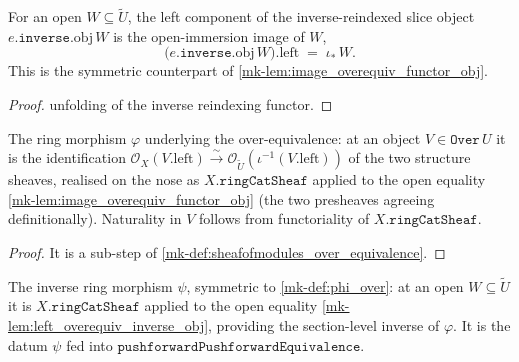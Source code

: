 \begin{lemma}\label{mk-lem:left_overequiv_inverse_obj}
  \leanok

  For an open \(W \subseteq \widetilde{U}\), the left component of the
  inverse-reindexed slice object \(e.\mathtt{inverse}.\mathrm{obj}\,W\) is the
  open-immersion image of \(W\),
  \[
    \bigl(e.\mathtt{inverse}.\mathrm{obj}\,W\bigr).\mathrm{left}
      \;=\; \iota_{\ast}\,W .
  \]
  This is the symmetric counterpart of \ref{mk-lem:image_overequiv_functor_obj}.
\end{lemma}

\begin{proof}
  \leanok
  unfolding of the inverse reindexing functor.
\end{proof}

\begin{definition}\label{mk-def:phi_over}
  \leanok

  The ring morphism \(\varphi\) underlying the over-equivalence: at an object
  \(V \in \mathtt{Over}\,U\) it is the identification
  \(\mathcal{O}_X(V.\mathrm{left}) \xrightarrow{\sim}
  \mathcal{O}_{\widetilde{U}}(\iota^{-1}(V.\mathrm{left}))\) of the two structure
  sheaves, realised on the nose as \(X.\mathtt{ringCatSheaf}\) applied to the open
  equality \ref{mk-lem:image_overequiv_functor_obj} (the two presheaves agreeing
  definitionally). Naturality in \(V\) follows from functoriality of
  \(X.\mathtt{ringCatSheaf}\).
\end{definition}

\begin{proof}
  \leanok
 It is a sub-step of
  \ref{mk-def:sheafofmodules_over_equivalence}.
\end{proof}

\begin{definition}\label{mk-def:psi_over}
  \leanok

  The inverse ring morphism \(\psi\), symmetric to \ref{mk-def:phi_over}: at an open
  \(W \subseteq \widetilde{U}\) it is \(X.\mathtt{ringCatSheaf}\) applied to the open
  equality \ref{mk-lem:left_overequiv_inverse_obj}, providing the section-level inverse
  of \(\varphi\). It is the datum \(\psi\) fed into
  \(\mathtt{pushforwardPushforwardEquivalence}\).
\end{definition}

